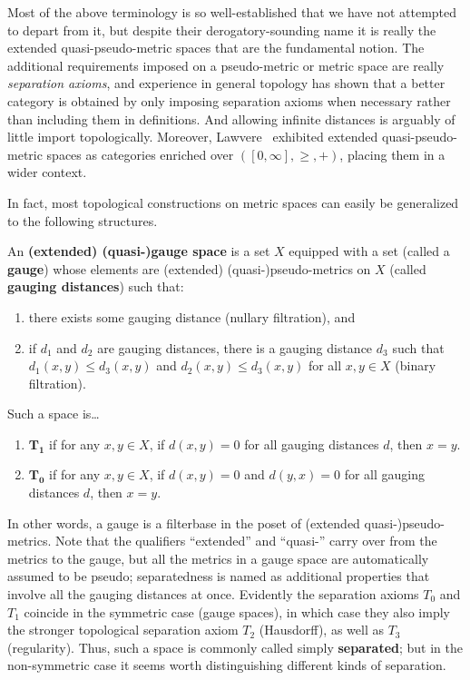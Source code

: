 \documentclass{article}
\def\Rp{[0,\infty]}
\begin{document}
Most of the above terminology is so well-established that we have not attempted to depart from it, but despite their derogatory-sounding name it is really the extended quasi-pseudo-metric spaces that are the fundamental notion.
The additional requirements imposed on a pseudo-metric or metric space are really \emph{separation axioms}, and experience in general topology has shown that a better category is obtained by only imposing separation axioms when necessary rather than including them in definitions.
And allowing infinite distances is arguably of little import topologically.
Moreover, Lawvere~\cite{lawvere:metric-spaces} exhibited extended quasi-pseudo-metric spaces as categories enriched over $(\Rp,\ge,+)$, placing them in a wider context.

In fact, most topological constructions on metric spaces can easily be generalized to the following structures.

\begin{defn}
  An \textbf{(extended) (quasi-)gauge space} is a set $X$ equipped with a set (called a \textbf{gauge}) whose elements are (extended) (quasi-)pseudo-metrics on $X$ (called \textbf{gauging distances}) such that:
  \begin{enumerate}
  \item there exists some gauging distance (nullary filtration), and
  \item if $d_1$ and $d_2$ are gauging distances, there is a gauging distance $d_3$ such that $d_1(x,y)\le d_3(x,y)$ and $d_2(x,y)\le d_3(x,y)$ for all $x,y\in X$ (binary filtration).
  \end{enumerate}
  Such a space is\dots
  \begin{enumerate}[resume]
  \item $\mathbf{T_1}$ if for any $x,y\in X$, if $d(x,y)=0$ for all gauging distances $d$, then $x=y$.
  \item $\mathbf{T_0}$ if for any $x,y\in X$, if $d(x,y)=0$ and $d(y,x)=0$ for all gauging distances $d$, then $x=y$.
  \end{enumerate}
\end{defn}

In other words, a gauge is a filterbase in the poset of (extended quasi-)pseudo-metrics.
Note that the qualifiers ``extended'' and ``quasi-'' carry over from the metrics to the gauge, but all the metrics in a gauge space are automatically assumed to be pseudo; separatedness is named as additional properties that involve all the gauging distances at once.
Evidently the separation axioms $T_0$ and $T_1$ coincide in the symmetric case (gauge spaces), in which case they also imply the stronger topological separation axiom $T_2$ (Hausdorff), as well as $T_3$ (regularity).
Thus, such a space is commonly called simply \textbf{separated}; but in the non-symmetric case it seems worth distinguishing different kinds of separation.
\end{document}
